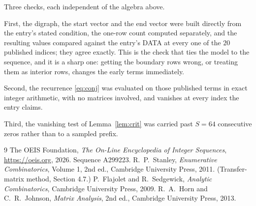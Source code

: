 \documentclass[11pt,a4paper]{article}
\theoremstyle{plain}
\theoremstyle{definition}
\begin{document}
Three checks, each independent of the algebra above.

First, the digraph, the start vector and the end vector were built directly from the
entry's stated condition, the one-row count computed separately, and the resulting values
compared against the entry's DATA at every one of the $20$ published indices; they
agree exactly. This is the check that ties the model to the sequence, and it is a sharp one:
getting the boundary rows wrong, or treating them as interior rows, changes the early terms
immediately.

Second, the recurrence \eqref{eq:conj} was evaluated on those published terms in exact
integer arithmetic, with no matrices involved, and vanishes at every index the entry claims.

Third, the vanishing test of Lemma~\ref{lem:crit} was carried past $S=64$ consecutive
zeros rather than to a sampled prefix.

\begin{thebibliography}{9}
 The OEIS Foundation, \emph{The On-Line Encyclopedia of Integer
Sequences}, \url{https://oeis.org}, 2026. Sequence A299223.
 R.~P.~Stanley, \emph{Enumerative Combinatorics}, Volume 1, 2nd ed.,
Cambridge University Press, 2011. (Transfer-matrix method, Section 4.7.)
 P.~Flajolet and R.~Sedgewick, \emph{Analytic Combinatorics}, Cambridge
University Press, 2009.
 R.~A.~Horn and C.~R.~Johnson, \emph{Matrix Analysis}, 2nd ed., Cambridge
University Press, 2013.
\end{thebibliography}
\end{document}
